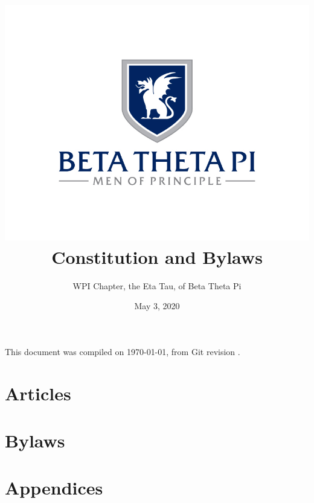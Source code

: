 \documentclass[12pt]{report}
\title{%
    \includegraphics[width=\textwidth]{figures/btp_tone.jpg}\\[1cm]
    Constitution and Bylaws
}
\author{WPI Chapter, the Eta Tau, of Beta Theta Pi}
\date{May 3, 2020}
\begin{document}


\begin{titlepage}
\maketitle
\end{titlepage}
\begin{center}
	\small This document was compiled on \today, from Git revision \Revision.
\end{center}
\clearpage


\clearpage
\setcounter{tocdepth}{1}
\tableofcontents
\clearpage

\renewcommand\chaptername{Article}
\part{Articles}









\setcounter{chapter}{0}
\renewcommand\chaptername{Item}
\part{Bylaws}




















\part{Appendices}
\appendix




\end{document}
